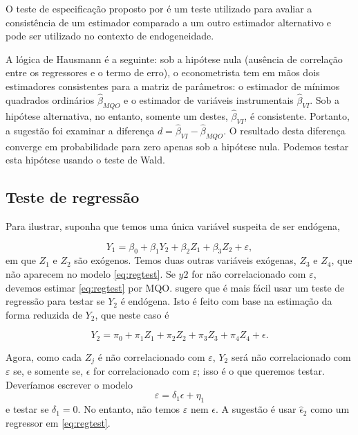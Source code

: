 \documentclass[
]{book}
\theoremstyle{definition}
\theoremstyle{definition}
\theoremstyle{definition}
\theoremstyle{remark}
\begin{document}
O teste de especificação proposto por \citet{hausman1978} é um teste utilizado para
avaliar a consistência de um estimador comparado a um outro estimador alternativo e pode ser utilizado no contexto de endogeneidade.

A lógica de Hausmann é a seguinte: sob a hipótese nula (ausência de correlação entre os
regressores e o termo de erro), o econometrista tem em mãos dois estimadores consistentes
para a matriz de parâmetros: o estimador de mínimos quadrados ordinários \(\hat{\beta}_{MQO}\) e o estimador de variáveis instrumentais \(\hat{\beta}_{VI}\). Sob a hipótese alternativa, no entanto, somente um destes, \(\hat{\beta}_{VI}\), é consistente. Portanto, a sugestão foi examinar a diferença
\(d= \hat{\beta}_{VI}-\hat{\beta}_{MQO}\). O resultado desta diferença converge em probabilidade para zero apenas sob a hipótese nula. Podemos testar esta hipótese usando o teste de Wald.

\hypertarget{teste-de-regressuxe3o}{%
\subsection{Teste de regressão}\label{teste-de-regressuxe3o}}

Para ilustrar, suponha que temos uma única variável suspeita de ser endógena,

\begin{equation}
 Y_1=\beta_0+\beta_1Y_2+\beta_2Z_1+\beta_3Z_2+\varepsilon,
  \label{eq:regtest}
 \end{equation}
em que \(Z_1\) e \(Z_2\) são exógenos. Temos duas outras variáveis exógenas, \(Z_3\) e \(Z_4\),
que não aparecem no modelo \eqref{eq:regtest}. Se \(y2\) for não correlacionado com \(\varepsilon\),
devemos estimar \eqref{eq:regtest} por MQO. \citet{wooldridge2016} sugere que é mais fácil
usar um teste de regressão para testar se \(Y_2\) é endógena. Isto é feito com base na
estimação da forma reduzida de \(Y_2\), que neste caso é

\begin{equation}
 Y_2=\pi_0+\pi_1Z_1+\pi_2Z_2+\pi_3Z_3+\pi_4Z_4+\epsilon.
 \label{eq:regtest2}
\end{equation}

Agora, como cada \(Z_j\) é não correlacionado com \(\varepsilon\), \(Y_2\) será não correlacionado
com \(\varepsilon\) se, e somente se, \(\epsilon\) for correlacionado com \(\varepsilon\); isso é o que queremos testar. Deveríamos escrever o modelo
\begin{equation}
 \varepsilon=\delta_1\epsilon+\eta_1
  \label{eq:regtest3}
\end{equation}
e testar se \(\delta_1=0\). No entanto, não temos \(\varepsilon\) nem \(\epsilon\). A sugestão é usar \(\hat{\epsilon}_2\) como um regressor em \eqref{eq:regtest}.
\end{document}
